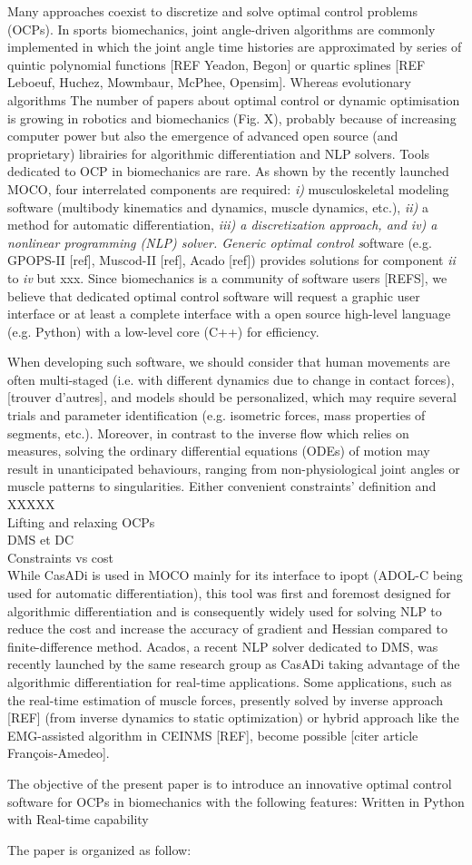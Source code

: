Many approaches coexist to discretize and solve optimal control problems (OCPs). In sports biomechanics, joint angle-driven algorithms are commonly implemented in which the joint angle time histories are approximated by series of quintic polynomial functions [REF Yeadon, Begon] or quartic splines [REF Leboeuf, Huchez, Mowmbaur, McPhee, Opensim]. 
Whereas evolutionary algorithms 
The number of papers about optimal control or dynamic optimisation is growing in robotics and biomechanics (Fig. X), probably because of increasing computer power but also the emergence of advanced open source (and proprietary) librairies for algorithmic differentiation and NLP solvers. 
Tools dedicated to OCP in biomechanics are rare. As shown by the recently launched MOCO, four interrelated components are required: \textit{i)} musculoskeletal modeling software (multibody kinematics and dynamics, muscle dynamics, etc.), \textit{ii)} a method for automatic differentiation, \textit{iii) a discretization approach, and \textit{iv)} a nonlinear programming (NLP) solver. Generic optimal control s}oftware (e.g. GPOPS-II [ref], Muscod-II [ref], Acado [ref]) provides solutions for component \textit{ii} to \textit{iv} but xxx. Since biomechanics is a community of software users [REFS], we believe that dedicated optimal control software will request a graphic user interface or at least a complete interface with a open source high-level language (e.g. Python) with a low-level core (C++) for efficiency. 

When developing such software, we should consider that human movements are often multi-staged (i.e. with different dynamics due to change in contact forces), [trouver d’autres], and models should be personalized, which may require several trials and parameter identification (e.g. isometric forces, mass properties of segments, etc.). 
Moreover, in contrast to the inverse flow which relies on measures, solving the ordinary differential equations (ODEs) of motion may result in unanticipated behaviours, ranging from non-physiological joint angles or muscle patterns to singularities. Either convenient constraints’ definition  and XXXXX\\ 

Lifting and relaxing OCPs\\ 
DMS et DC\\
Constraints vs cost\\


While CasADi is used in MOCO mainly for its interface to ipopt (ADOL-C being used for automatic differentiation),  this tool was first and foremost designed for algorithmic differentiation and is consequently widely used for solving NLP to reduce the cost and increase the accuracy of gradient and Hessian compared to finite-difference method. Acados, a recent NLP solver dedicated to DMS, was recently launched by the same research group as CasADi taking advantage of the algorithmic differentiation for real-time applications. Some applications, such as the real-time estimation of muscle forces, presently solved by inverse approach [REF] (from inverse dynamics to static optimization) or hybrid approach like the EMG-assisted algorithm in CEINMS [REF], become possible [citer article François-Amedeo].


The objective of the present paper is to introduce an innovative optimal control software for OCPs in biomechanics with the following features: 
Written in Python with 
Real-time capability 



The paper is organized as follow: 
